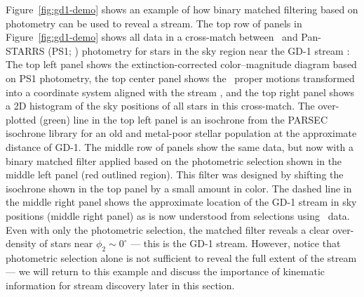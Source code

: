\documentclass[final,5p,times,twocolumn,authoryear]{elsarticle}
\begin{document}
Figure~\ref{fig:gd1-demo} shows an example of how binary matched filtering based on
photometry can be used to reveal a stream.
The top row of panels in Figure~\ref{fig:gd1-demo} shows all data in a cross-match
between \gaia\ and Pan-STARRS (PS1; \citealt{chambers:2016}) photometry for stars in the
sky region near the GD-1 stream \citep{grillmair:2006-gd1}: The top left panel shows the
extinction-corrected color--magnitude diagram based on PS1 photometry, the top center
panel shows the \gaia\ proper motions transformed into a coordinate system aligned with
the stream \citep{koposov:2010}, and the top right panel shows a 2D histogram of the sky
positions of all stars in this cross-match.
The over-plotted (green) line in the top left panel is an isochrone from the PARSEC
\citep{bressan:2012, chen:2015} isochrone library for an old and metal-poor stellar
population at the approximate distance of GD-1.
The middle row of panels show the same data, but now with a binary matched filter
applied based on the photometric selection shown in the middle left panel (red outlined
region).
This filter was designed by shifting the isochrone shown in the top panel by a small
amount in color.
The dashed line in the middle right panel shows the approximate location of the GD-1
stream in sky positions (middle right panel) as is now understood from selections using
\gaia\ data.
Even with only the photometric selection, the matched filter reveals a clear
over-density of stars near $\phi_2 \sim 0^\circ$ --- this is the GD-1 stream.
However, notice that photometric selection alone is not sufficient to reveal the full
extent of the stream --- we will return to this example and discuss the importance of
kinematic information for stream discovery later in this section.
\end{document}
